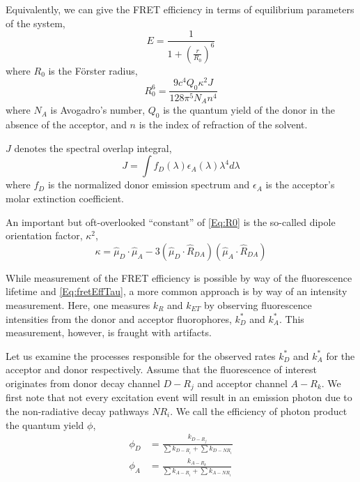 \documentclass{article}
\begin{document}
Equivalently, we can give the FRET efficiency in terms of equilibrium
parameters of the system,
\begin{equation}
  E = \frac{1}{1 + \left( \frac{r}{R_0} \right)^6}
  \label{Eq:fretEff}
\end{equation}
where $R_0$ is the F\"orster radius,
\begin{equation}
  R_0^6 = \frac{9 c^4 Q_0 \kappa^2 J}{128 \pi^5 N_A n^4}
  \label{Eq:R0}
\end{equation}
where $N_A$ is Avogadro's number, $Q_0$ is the quantum yield of the
donor in the absence of the acceptor, and $n$ is the index of
refraction of the solvent.

$J$ denotes the spectral overlap integral,
\[ J = \int f_D(\lambda) \epsilon_A(\lambda) \lambda^4 d\lambda \]
where $f_D$ is the normalized donor emission spectrum and $\epsilon_A$
is the acceptor's molar extinction coefficient.

An important but oft-overlooked ``constant'' of \eqref{Eq:R0} is
the so-called dipole orientation factor, $\kappa^2$,
\begin{equation}
  \kappa = \hat\mu_D \cdot \hat\mu_A - 3(\hat\mu_D \cdot \hat R_{DA}) (\hat\mu_A \cdot \hat R_{DA})
  \label{Eq:kappa}
\end{equation}

While measurement of the FRET efficiency is possible by way of the
fluorescence lifetime and \eqref{Eq:fretEffTau}, a more common
approach is by way of an intensity measurement. Here, one 
measures $k_{R}$ and $k_{ET}$ by observing fluorescence intensities
from the donor and acceptor fluorophores, $k^*_D$ and $k^*_A$. This
measurement, however, is fraught with artifacts.

Let us examine the processes responsible for the observed rates
$k^*_D$ and $k^*_A$ for the acceptor and donor respectively. Assume
that the fluorescence of interest originates from donor decay channel
$D-R_j$ and acceptor channel $A-R_k$. We first note that not every
excitation event will result in an emission photon due to the
non-radiative decay pathways $NR_i$. We call the efficiency of photon
product the quantum yield $\phi$,
\begin{align*}
  \phi_D & = \frac{k_{D-R_j}}{\sum k_{D-R_i} + \sum k_{D-NR_i}} \\
  \phi_A & = \frac{k_{A-R_k}}{\sum k_{A-R_i} + \sum k_{A-NR_i}} \\
\end{align*}
\end{document}
